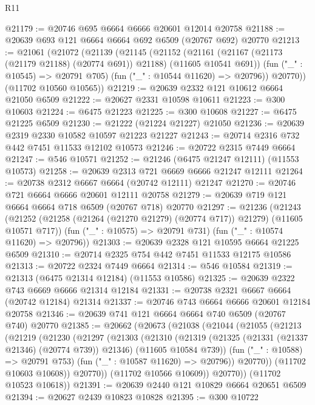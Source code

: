 \begin{lexlean}{R11}
\begin{coremodule}
{{{{{{{{{{{{{{{{{{{{{{{{{{{{{{{{{{{{{{{{{{{{{{{{{{{{{{{{{{{{{{{{{{{{{{{{{{{{{{{{{{@21179 := @20746 @695 @6664 @6666 @20601 @12014 @20758
@21188 := @20639 @693 @121 @6664 @6664 @692 @6509 (@20767 @692) @20770
@21213 := @21061
    (@21072
      (@21139
        (@21145
          (@21152
            (@21161 (@21167 (@21173 (@21179 @21188) (@20774 @691)) @21188) (@11605 @10541 @691))
            (fun ("_" : @10545) => @20791 @705)
            (fun ("_" : @10544 @11620) => @20796))
          @20770))
      (@11702 @10560 @10565))
@21219 := @20639 @2332 @121 @10612 @6664 @21050 @6509
@21222 := @20627 @2331 @10598 @10611
@21223 := @300 @10603
@21224 := @6475 @21223
@21225 := @300 @10608
@21227 := @6475 @21225 @6509
@21230 := @21222 (@21224 @21227) @21050
@21236 := @20639 @2319 @2330 @10582 @10597 @21223 @21227
@21243 := @20714 @2316 @732 @442 @7451 @11533 @12102 @10573
@21246 := @20722 @2315 @7449 @6664
@21247 := @546 @10571
@21252 := @21246 (@6475 @21247 @12111) (@11553 @10573)
@21258 := @20639 @2313 @721 @6669 @6666 @21247 @12111
@21264 := @20738 @2312 @6667 @6664 (@20742 @12111) @21247
@21270 := @20746 @721 @6664 @6666 @20601 @12111 @20758
@21279 := @20639 @719 @121 @6664 @6664 @718 @6509 (@20767 @718) @20770
@21297 := @21236
    (@21243
      (@21252 (@21258 (@21264 (@21270 @21279) (@20774 @717)) @21279) (@11605 @10571 @717))
      (fun ("_" : @10575) => @20791 @731)
      (fun ("_" : @10574 @11620) => @20796))
@21303 := @20639 @2328 @121 @10595 @6664 @21225 @6509
@21310 := @20714 @2325 @754 @442 @7451 @11533 @12175 @10586
@21313 := @20722 @2324 @7449 @6664
@21314 := @546 @10584
@21319 := @21313 (@6475 @21314 @12184) (@11553 @10586)
@21325 := @20639 @2322 @743 @6669 @6666 @21314 @12184
@21331 := @20738 @2321 @6667 @6664 (@20742 @12184) @21314
@21337 := @20746 @743 @6664 @6666 @20601 @12184 @20758
@21346 := @20639 @741 @121 @6664 @6664 @740 @6509 (@20767 @740) @20770
@21385 := @20662
    (@20673
      (@21038
        (@21044
          (@21055
            (@21213
              (@21219
                (@21230
                  (@21297
                    (@21303
                      (@21310
                        (@21319
                          (@21325 (@21331 (@21337 @21346) (@20774 @739)) @21346)
                          (@11605 @10584 @739))
                        (fun ("_" : @10588) => @20791 @753)
                        (fun ("_" : @10587 @11620) => @20796))
                      @20770))
                  (@11702 @10603 @10608))
                @20770))
            (@11702 @10566 @10609))
          @20770))
      (@11702 @10523 @10618))
@21391 := @20639 @2440 @121 @10829 @6664 @20651 @6509
@21394 := @20627 @2439 @10823 @10828
@21395 := @300 @10722
}}}}}}}}}}}}}}}}}}}}}}}}}}}}}}}}}}}}}}}}}}}}}}}}}}}}}}}}}}}}}}}}}}}}}}}}}}}}}}}}}}
\end{coremodule}
\end{lexlean}
